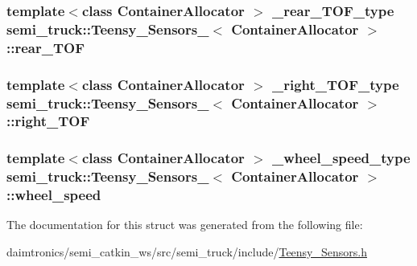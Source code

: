 \subsubsection[{\texorpdfstring{rear\+\_\+\+T\+OF}{rear_TOF}}]{\setlength{\rightskip}{0pt plus 5cm}template$<$class Container\+Allocator $>$ {\bf \+\_\+rear\+\_\+\+T\+O\+F\+\_\+type} {\bf semi\+\_\+truck\+::\+Teensy\+\_\+\+Sensors\+\_\+}$<$ Container\+Allocator $>$\+::rear\+\_\+\+T\+OF}\hypertarget{structsemi__truck_1_1_teensy___sensors___aaed96e5feb07aa8a729524f2b643a4c9}{}\label{structsemi__truck_1_1_teensy___sensors___aaed96e5feb07aa8a729524f2b643a4c9}
\subsubsection[{\texorpdfstring{right\+\_\+\+T\+OF}{right_TOF}}]{\setlength{\rightskip}{0pt plus 5cm}template$<$class Container\+Allocator $>$ {\bf \+\_\+right\+\_\+\+T\+O\+F\+\_\+type} {\bf semi\+\_\+truck\+::\+Teensy\+\_\+\+Sensors\+\_\+}$<$ Container\+Allocator $>$\+::right\+\_\+\+T\+OF}\hypertarget{structsemi__truck_1_1_teensy___sensors___acd1bf8a8cdb1073974200b6ae0c7a179}{}\label{structsemi__truck_1_1_teensy___sensors___acd1bf8a8cdb1073974200b6ae0c7a179}
\subsubsection[{\texorpdfstring{wheel\+\_\+speed}{wheel_speed}}]{\setlength{\rightskip}{0pt plus 5cm}template$<$class Container\+Allocator $>$ {\bf \+\_\+wheel\+\_\+speed\+\_\+type} {\bf semi\+\_\+truck\+::\+Teensy\+\_\+\+Sensors\+\_\+}$<$ Container\+Allocator $>$\+::wheel\+\_\+speed}\hypertarget{structsemi__truck_1_1_teensy___sensors___adbe8f5f099fb3077164702fc3af3c739}{}\label{structsemi__truck_1_1_teensy___sensors___adbe8f5f099fb3077164702fc3af3c739}


The documentation for this struct was generated from the following file\+:\begin{DoxyCompactItemize}
\item 
daimtronics/semi\+\_\+catkin\+\_\+ws/src/semi\+\_\+truck/include/\hyperlink{_teensy___sensors_8h}{Teensy\+\_\+\+Sensors.\+h}\end{DoxyCompactItemize}
